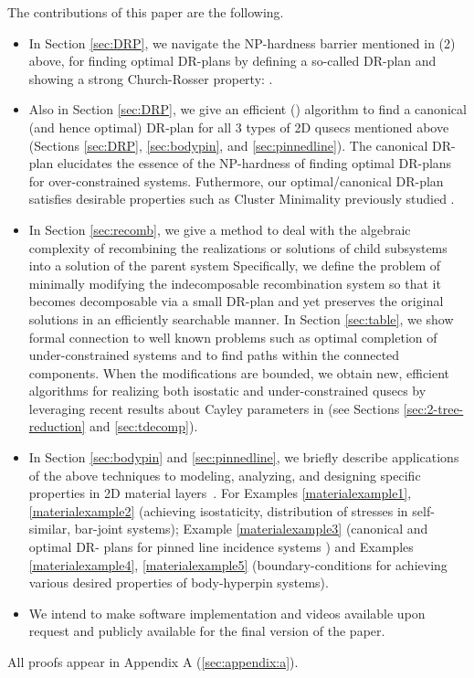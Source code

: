 The contributions of this paper are the following.
\begin{itemize}
  \item In Section \ref{sec:DRP}, we navigate the NP-hardness barrier mentioned in (2) above,
  for finding optimal DR-plans by defining a so-called 
  DR-plan and showing a strong Church-Rosser property: .

  \item Also in Section \ref{sec:DRP}, we give an efficient (\candrpcomplexity) algorithm to find a canonical
  (and hence optimal) DR-plan for all 3 types of 2D qusecs mentioned
  above (Sections \ref{sec:DRP}, \ref{sec:bodypin}, and
  \ref{sec:pinnedline}). The canonical DR-plan elucidates the essence
  of the NP-hardness of finding optimal DR-plans for over-constrained
  systems. Futhermore, our optimal/canonical DR-plan satisfies desirable properties such as Cluster Minimality previously studied \cite{hoffman2001decompositionI}.

  \item In Section \ref{sec:recomb}, we give a method to deal with the
  algebraic complexity of recombining the realizations or solutions of
  child subsystems into a solution of the parent system
  \cite{sitharam2010optimized,sitharam2006well,sitharam2010reconciling}
  Specifically, we define the problem of minimally modifying the
  indecomposable recombination system so that it becomes decomposable
  via a small DR-plan and yet preserves the original solutions in an
  efficiently searchable manner. In Section \ref{sec:table}, we show formal connection to well
  known problems such as optimal completion of under-constrained
  systems
  \cite{joan-arinyo2003transforming,sitharam2005combinatorial,gao2006ctree}
  and to find paths within the connected components. When the
  modifications are bounded, we obtain new, efficient algorithms for
  realizing both isostatic and under-constrained qusecs by leveraging
  recent results about Cayley parameters in
  \cite{sitharam2010convex,sitharam2011cayleyI,sitharam2011cayleyII} (see Sections \ref{sec:2-tree-reduction} and \ref{sec:tdecomp}).

  \item In Section \ref{sec:bodypin} and \ref{sec:pinnedline}, we
  briefly describe applications of the above techniques to modeling,
  analyzing, and designing specific properties in 2D material
  layers~\cite{Jackson2008bodypin}. For Examples
  \ref{materialexample1}, \ref{materialexample2} (achieving
  isostaticity, distribution of stresses in self-similar, bar-joint
  systems); Example \ref{materialexample3} (canonical and optimal DR-
  plans for pinned line incidence systems
  \cite{sitharam2014incidence}) and Examples \ref{materialexample4},
  \ref{materialexample5} (boundary-conditions for achieving various
  desired properties of body-hyperpin systems).

  \item We intend to make software implementation and videos available
  upon request and publicly available for the final version of the
  paper.
\end{itemize}

\noindent
\note All proofs appear in Appendix A (\ref{sec:appendix:a}).
